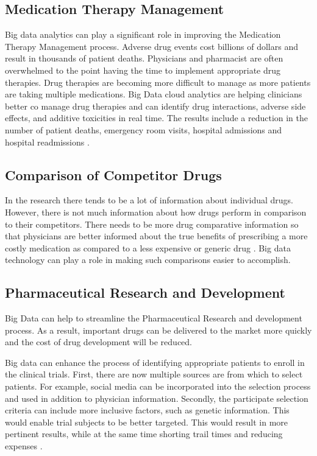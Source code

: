 \documentclass[sigconf]{acmart}
\begin{document}
{\subsection{Medication Therapy Management}
Big data analytics can play a significant role in improving the Medication Therapy Management process.  Adverse drug events cost billions of dollars and result in thousands of patient deaths.  Physicians and pharmacist are often overwhelmed to the point having the time to implement appropriate drug therapies. Drug therapies are becoming more difficult to manage as more patients are taking multiple medications.  Big Data cloud analytics are helping clinicians better co manage drug therapies and can identify drug interactions, adverse side effects, and additive toxicities in real time. The results include a  reduction in the number of patient deaths, emergency room visits, hospital admissions and hospital readmissions \cite{www-google-data}.

\subsection{Comparison of Competitor Drugs}
In the research there tends to be a lot of information about individual drugs. However, there is not much information about how drugs perform in comparison to their competitors.  There needs to be more drug comparative information so that physicians are better informed about the true benefits of prescribing a more costly medication as compared to a less expensive or generic drug \cite{www-google-drug}. Big data technology can play a role in making such comparisons easier to accomplish. 

\subsection{Pharmaceutical Research and Development}

Big Data can help to streamline the Pharmaceutical Research and development process. As a result, important drugs can be delivered to the market more quickly and the cost of drug development will be reduced.

Big data can enhance the process of identifying appropriate patients to enroll in the clinical trials. First, there are now multiple  sources are from which to select patients. For example, social media can be incorporated into the selection process and used in addition to physician information. Secondly, the participate selection criteria can include more inclusive factors, such as genetic information. This would enable trial subjects to be better targeted. This would result in more pertinent results, while at the same time shorting trail times and reducing expenses \cite{www-google-pharmrd}.

}
\end{document}
